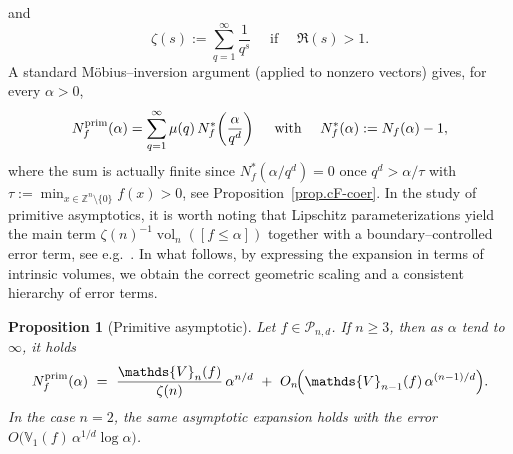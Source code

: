 \documentclass[11pt]{article}
\newtheorem{proposition}[theorem]{Proposition}
\theoremstyle{definition}
\numberwithin{equation}{section}
\newcommand{\Z}{\mathbb{Z}}
\newcommand{\cP}{\mathcal{P}}        %
\newcommand{\opV}{\mathds{V}}       %
\DeclareMathOperator{\vol}{vol}
\begin{document}
and
\[
\zeta(s) := \sum_{q=1}^{\infty} \frac{1}{q^s} \quad \text{ if } \quad \Re(s) > 1.
\]
A standard M\"obius–inversion argument (applied to nonzero vectors) gives, for every $\alpha>0$,
\begin{equation}\label{eq:mobius-identity}
  N^{\rm prim}_f(\alpha)
  =
  \sum_{q=1}^{\infty}\mu(q) \,N_f^\ast\!\left(\frac{\alpha}{q^d}\right) \quad \text{ with } \quad N_f^\ast(\alpha):=N_f(\alpha)-1,
\end{equation}
where the sum is actually finite since $N_f^\ast(\alpha/q^d)=0$ once $q^d>\alpha/\tau$ with $\tau:=\textstyle\min_{x\in\Z^n\setminus\{0\}}f(x)>0$, see Proposition~\ref{prop.cF-coer}.
In the study of primitive asymptotics, it is worth noting that Lipschitz parameterizations yield the main term $\zeta(n)^{-1}\vol_n([f\le \alpha])$ together with a boundary–controlled error term, see e.g.~\cite{Widmer2010Primitive,Widmer2012Lipschitz}.
In what follows, by expressing the expansion in terms of intrinsic volumes, we obtain the correct geometric scaling and a consistent hierarchy of error terms.

\begin{proposition}[Primitive asymptotic]\label{thm:primitive}
Let $f\in\cP_{n,d}$. 
If $n\ge3$, then as $\alpha$ tend to $\infty$, it holds
\[
  N^{\rm prim}_f(\alpha)\ =\ \frac{\opV_n(f)}{\zeta(n)}\,\alpha^{n/d}
  \ +\ O_n\!\Big(\opV_{n-1}(f)\,\alpha^{(n-1)/d}\Big).
\]
In the case $n=2$, the same asymptotic expansion holds with the error $O\!\big(\opV_{1}(f)\,\alpha^{1/d}\log \alpha\big)$.
\end{proposition}
\end{document}
